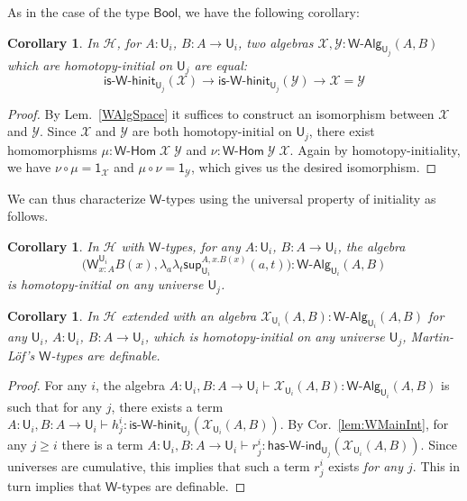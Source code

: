 \documentclass[reqno,10pt,a4paper,oneside]{amsart}
\numberwithin{equation}{section}
\theoremstyle{mythm}
\newtheorem{corollary}[theorem]{Corollary}
\theoremstyle{mydef}
\theoremstyle{myrmk}
\newcommand{\comp}{\circ}
\newcommand{\Hint}{\mathcal{H}}
\newcommand{\lam}[1]{\lambda_{#1}}
\newcommand{\W}{\mathsf{W}}
\newcommand{\wsup}{\mathsf{sup}}
\newcommand{\Bool}{\mathsf{Bool}}
\newcommand{\one}{\mathsf{1}}
\newcommand{\UU}{\mathsf{U}}
\newcommand{\WAlg}{\mathsf{W}\text{-}\mathsf{Alg}}
\newcommand{\WHom}{\mathsf{W}\text{-}\mathsf{Hom}}
\newcommand{\HasWInd}{\mathsf{has}\text{-}\mathsf{W}\text{-}\mathsf{ind}}
\newcommand{\IsWHInit}{\mathsf{is}\text{-}\mathsf{\W}\text{-}\mathsf{hinit}}
\newcommand{\X}{\mathcal{X}}
\newcommand{\Y}{\mathcal{Y}}
\begin{document}
As in the case of the type $\Bool$, we have the following corollary:
\begin{corollary}\label{WHInitIso}
In $\Hint$, for $A:\UU_i$, $B : A \to \UU_i$, two algebras $\X,\Y : \WAlg_{\UU_j}(A,B)$ which are homotopy-initial on $\UU_j$ are equal:
\[ \IsWHInit_{\UU_j}(\X) \to \IsWHInit_{\UU_j}(\Y) \to \X = \Y\] 
\end{corollary}
\begin{proof}
By Lem.~\ref{WAlgSpace} it suffices to construct an isomorphism between $\X$ and $\Y$. Since $\X$ and $\Y$ are both homotopy-initial on $\UU_j$, there exist homomorphisms $\mu : \WHom \; \X \; \Y$ and $\nu : \WHom \; \Y \; \X$. Again by homotopy-initiality, we have $\nu \comp \mu = \one_\X$ and $\mu \comp \nu = \one_\Y$, which gives us the desired isomorphism.
\end{proof}

We can thus characterize $\W$-types using the universal property of initiality as follows.
\begin{corollary}\label{lem:WInitInt}
In $\Hint$ with $\W$-types, for any $A:\UU_i$, $B : A \to \UU_i$, the algebra \[\Big(\W^{\UU_i}_{x:A}B(x),\lam{a}\lam{t} \wsup_{\UU_i}^{A,x.B(x)}(a,t) \Big) : \WAlg_{\UU_i}(A,B)\] is homotopy-initial on any universe $\UU_j$.
\end{corollary}

\begin{corollary}\label{lem:WCharInt}
In $\Hint$ extended with an algebra $\X_{\UU_i}(A,B) : \WAlg_{\UU_i}(A,B)$ for any $\UU_i$, $A : \UU_i$, $B : A \to \UU_i$, which is homotopy-initial on any universe $\UU_j$, Martin-L{\"o}f's $\W$-types are definable.
\end{corollary}
\begin{proof}
For any $i$, the algebra $A:\UU_i,B:A\to \UU_i \vdash \X_{\UU_i}(A,B) : \WAlg_{\UU_i}(A,B)$ is such that for any $j$, there exists a term $A:\UU_i,B:A\to \UU_i \vdash h^i_j  : \IsWHInit_{\UU_j}(\X_{\UU_i}(A,B))$. By Cor.~\ref{lem:WMainInt}, for any $j \geq i$ there is a term $A:\UU_i,B:A\to \UU_i \vdash r^i_j : \HasWInd_{\UU_j}(\X_{\UU_i}(A,B))$. Since universes are cumulative, this implies that such a term $r^i_j$ exists \emph{for any $j$}. This in turn implies that $\W$-types are definable.
\end{proof}
\end{document}
